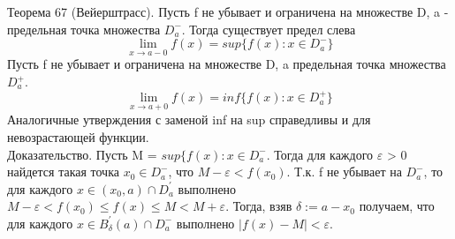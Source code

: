 \documentclass[12pt]{article}
\theoremstyle{definition}
\begin{document}
Теорема 67 (Вейерштрасс). Пусть f не убывает и ограничена на множестве D, a - предельная точка множества $D^{-}_{a}$. Тогда существует предел слева
$$\lim_{x \to a-0} f(x) = sup\{f(x):x \in D^{-}_{a}\}$$
Пусть f не убывает и ограничена на множестве D, a предельная точка множества $D^{+}_{a}$. $$\lim_{x \to a+0} f(x) = inf\{f(x):x \in D^{+}_{a}\}$$
Аналогичные утверждения с заменой inf на sup справедливы и для невозрастающей
функции.\\
Доказательство. Пусть M = $sup\{f(x):x \in D^{-}_{a}$. Тогда для каждого $\varepsilon$ > 0 найдется такая точка $x_0 \in D^{-}_{a}$, что $M-\varepsilon < f(x_0)$. Т.к. f не убывает на $D^{-}_{a}$, то для каждого $x \in (x_0, a) \cap D^{'}_{a} $ выполнено $M - \varepsilon < f(x_0) \leq f(x) \leq M < M + \varepsilon$. Тогда, взяв $\delta := a - x_0$ получаем, что для каждого $x \in B^{'}_{\delta}(a) \cap D^{-}_{a}$ выполнено $|f(x) - M| < \varepsilon$.
\end{document}
